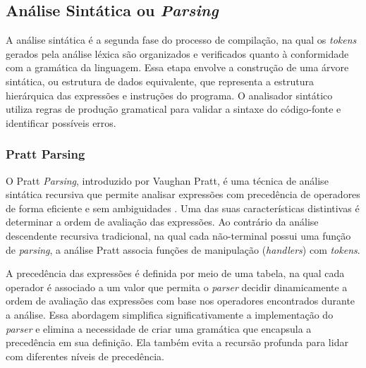 \documentclass[english,
               brazil,
               bsc] %
               {dcomp-abntex2}
\begin{document}
\subsection{Análise Sintática ou \textit{Parsing}}
A análise sintática é a segunda fase do processo de compilação, na qual os \textit{tokens} gerados pela análise léxica são organizados e verificados quanto à conformidade com a gramática da linguagem. Essa etapa envolve a construção de uma árvore sintática, ou estrutura de dados equivalente, que representa a estrutura hierárquica das expressões e instruções do programa. O analisador sintático utiliza regras de produção gramatical para validar a sintaxe do código-fonte e identificar possíveis erros.


\subsubsection{Pratt Parsing}
O Pratt \textit{Parsing}, introduzido por Vaughan Pratt, é uma técnica de análise sintática recursiva que permite analisar expressões com precedência de operadores de forma eficiente e sem ambiguidades \cite{pratt}. Uma das suas características distintivas é determinar a ordem de avaliação das expressões. Ao contrário da análise descendente recursiva tradicional, na qual cada não-terminal possui uma função de \textit{parsing}, a análise Pratt associa funções de manipulação (\textit{handlers}) com \textit{tokens}.


A precedência das expressões é definida por meio de uma tabela, na qual cada operador é associado a um valor que permita o \textit{parser} decidir dinamicamente a ordem de avaliação das expressões com base nos operadores encontrados durante a análise. Essa abordagem simplifica significativamente a implementação do \textit{parser} e elimina a necessidade de criar uma gramática que encapsula a precedência em sua definição. Ela também evita a recursão profunda para lidar com diferentes níveis de precedência.
\end{document}
